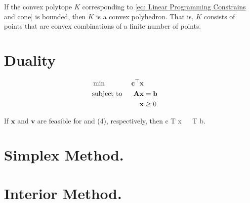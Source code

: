 \begin{corollary}
	If the convex polytope $K$ corresponding to \eqref{eq: Linear Programming Constrains and cone} is bounded, then $K$ is a convex polyhedron. That is, $K$ consists of points that are convex combinations of a finite number of points.
\end{corollary}
\section{Duality}


\begin{align}
&\min & \mathbf{c}^\top\mathbf{x} \label{eq: Linear Programming Min}&\\
&\text{subject to }& \mathbf{A}\mathbf{x}&=\mathbf{b} & \label{eq: Linear Programming Constraints} \\
& &\mathbf{x}&\geq 0 & \label{eq: Linear Programming cone}
\end{align} 

\begin{lemma}
If $\mathbf{x}$ and $\mathbf{v}$ are feasible for  and (4), respectively, then c T x   T b.
\end{lemma}
\section{Simplex Method.}

\section{Interior Method.}
